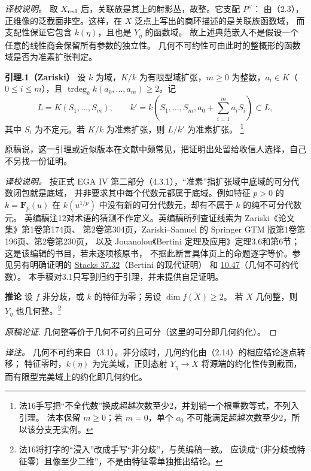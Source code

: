 \documentclass[openany,fontset=fandol]{ctexbook}
\newcommand{\tagitem}[2]{\par\medskip\noindent\textbf{#1\quad #2}\enspace}
\begin{document}
\noindent\emph{译校说明。}
取 $X_{\rm red}$ 后，关联族是其上的射影丛，故整。它支配 $P^\vee$：
由（2.3），正维像的泛截面非空。这样，在 $X$ 泛点上写出的商环描述的是关联族函数域，
而支配性保证它包含 $k(\eta)$，且也是 $Y_\eta$ 的函数域。
故上述典范嵌入不是假设一个任意的线性商会保留所有参数的独立性。
几何不可约性可由此时的整概形的函数域是否为准素扩张判定。

\tagitem{引理}{3.1.1（Zariski）}
设 $k$ 为域，$K/k$ 为有限型域扩张，$m\ge0$ 为整数，$a_i\in K$（$0\le i\le m$），且
$\operatorname{trdeg}_k k(a_0,\ldots,a_m)\ge2$。记
\[
 L=K(S_1,\ldots,S_m),\qquad
 k'=k\left(S_1,\ldots,S_m,a_0+\sum_{i=1}^m a_iS_i\right)\subset L,
\]
其中 $S_i$ 为不定元。若 $K/k$ 为准素扩张，则 $L/k'$ 为准素扩张。
\footnote{法16手写把“不全代数”换成超越次数至少2，并划销一个根重数等式，不列入引理。
法本保留 $m\ge0$；若 $m=0$，单个 $a_0$ 不可能满足超越次数至少2，所以该分支无实例。}

原稿说，这一引理或近似版本在文献中颇常见，把证明出处留给收信人选择，自己不另找一份证明。

\noindent\emph{译校说明。}
按正式 EGA IV 第二部分（4.3.1），“准素”指扩张域中底域的可分代数闭包就是底域，
并非要求其中每个代数元都属于底域。例如特征 $p>0$ 的 $k=\mathbf F_p(u)$
在 $k(u^{1/p})$ 中没有新的可分代数元，却有不属于 $k$ 的纯不可分代数元。
英编稿注12对术语的猜测不作定义。英编稿所列查证线索为 Zariski《论文集》第1卷第174页、
第2卷第304页，Zariski--Samuel 的 Springer GTM 版第1卷第196页、第2卷第230页，
以及 Jouanolou《Bertini 定理及应用》定理3.6和第6节；这是该编辑的书目，若未逐项核原书，
不据此断言具体页上的命题逐字等价。参见另有明确证明的
\href{https://stacks.math.columbia.edu/tag/0G4C}{Stacks 37.32}（Bertini 的现代证明）
和 \href{https://stacks.math.columbia.edu/tag/00I2}{10.47}（几何不可约代数）。
本手稿对3.1只写到归约于引理，并未提供自足证明。

\tagitem{推论}{3.2}
设 $f$ 非分歧，或 $k$ 的特征为零；另设 $\dim\overline{f(X)}\ge2$。
若 $X$ 几何整，则 $Y_\eta$ 也几何整。\footnote{法16将打字的“浸入”改成手写“非分歧”，与英编稿一致。
应读成“（非分歧或特征零）且像至少二维”，不是由特征零单独推出结论。}
\begin{proof}[原稿论证]
几何整等价于几何不可约且可分（这里的可分即几何约化）。
\end{proof}
\noindent\emph{译注。}
几何不可约来自（3.1）。非分歧时，几何约化由（2.14）的相应结论逐点转移；
特征零时，$k(\eta)$ 为完美域，正则态射 $Y_\eta\to X$ 将源端的约化性传到截面，
而有限型完美域上的约化即几何约化。
\end{document}
